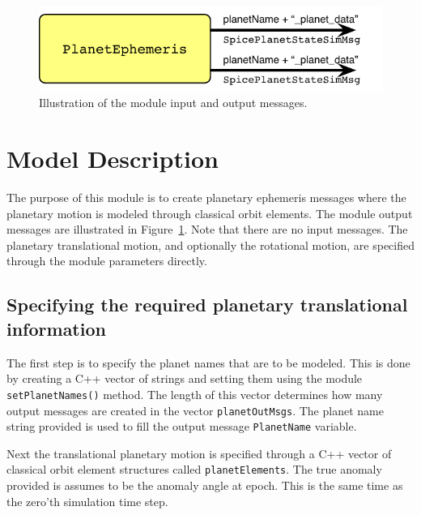 

\begin{figure}[h]
	\centerline{
		\includegraphics{Figures/moduleImg}
	}
	\caption{Illustration of the module input and output messages.}
	\label{fig:moduleImg}
\end{figure}


\section{Model Description}
The purpose of this module is to create planetary ephemeris messages where the planetary motion is modeled through classical orbit elements.  The module output messages are illustrated in Figure~\ref{fig:moduleImg}.  Note that there are no input messages.  The planetary translational motion, and optionally the rotational motion, are specified through the module parameters directly.  


\subsection{Specifying the required planetary translational information}
The first step is to specify the planet names that are to be modeled.  This is done by creating a C++ vector of strings and setting them using the module {\tt setPlanetNames()} method.  The length of this vector determines how many output messages are created in the vector {\tt planetOutMsgs}.  The planet name string provided is used to fill the output message {\tt PlanetName} variable.

Next the translational planetary motion is specified through a C++ vector of classical orbit element structures called {\tt planetElements}.  The true anomaly provided is assumes to be the anomaly angle at epoch.  This is the same time as the zero'th simulation time step. 






